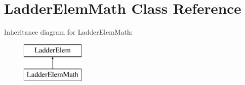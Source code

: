 \hypertarget{class_ladder_elem_math}{\section{Ladder\-Elem\-Math Class Reference}
\label{class_ladder_elem_math}
}
Inheritance diagram for Ladder\-Elem\-Math\-:\begin{figure}[H]
\begin{center}
\leavevmode
\includegraphics[height=2.000000cm]{class_ladder_elem_math}
\end{center}
\end{figure}
